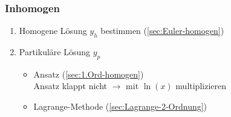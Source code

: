     \subsubsection{Inhomogen}
        \vspace{0.5em}
        \begin{enumerate}
            \item Homogene Lösung $y_h$ bestimmen (\ref{sec:Euler-homogen})
            \item Partikuläre Lösung $y_p$
            \begin{itemize}
                \item Ansatz (\ref{sec:1.Ord-homogen})\\
                      Ansatz klappt nicht $\to$ mit $\ln(x)$ multiplizieren
                \item Lagrange-Methode (\ref{sec:Lagrange-2-Ordnung})
            \end{itemize}
        \end{enumerate}